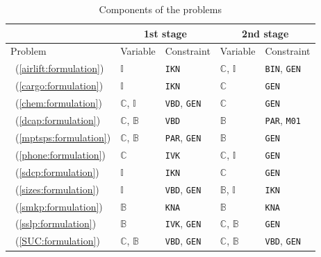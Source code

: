 \begin{table}[H]
	\centering
	\caption{Components of the problems}
	\label{table:prob_class}
	\begin{threeparttable}
		\begin{tabular}{@{}lllll@{}}
			\toprule
			& \multicolumn{2}{c}{1st stage}                              				  	& \multicolumn{2}{c}{2nd stage}                             			        \\ \midrule
			Problem 	     & Variable                    & Constraint                   	& Variable                    & Constraint                  				    \\ \midrule
			\airlift\ (\ref{airlift:formulation}) & $\mathbb{I}$ & \texttt{IKN}& $\mathbb{C}$, $\mathbb{I}$ & \texttt{BIN}, \texttt{GEN}\\
			\cargo\ (\ref{cargo:formulation}) & $\mathbb{I}$ & \texttt{IKN} & $\mathbb{C}$ & \texttt{GEN}\\		
			\chem\ (\ref{chem:formulation}) & $\mathbb{C}$, $\mathbb{I}$ & \texttt{VBD}, \texttt{GEN} & $\mathbb{C}$ & \texttt{GEN}\\				
			\dcap\ (\ref{dcap:formulation})    & $\mathbb{C}$, $\mathbb{B}$  & \texttt{VBD}                	& $\mathbb{B}$                & \texttt{PAR}, \texttt{M01} 			    		\\
			\mptsps\ (\ref{mptsps:formulation})  & $\mathbb{C}$, $\mathbb{B}$  & \texttt{PAR}, \texttt{GEN}		& $\mathbb{B}$                & \texttt{GEN}               						\\
			\phone\ (\ref{phone:formulation}) & $\mathbb{C}$ & \texttt{IVK} & $\mathbb{C}$, $\mathbb{I}$ & \texttt{GEN} \\			
			\sdcp\ (\ref{sdcp:formulation}) & $\mathbb{I}$ & \texttt{IKN}& $\mathbb{C}$ & \texttt{GEN}\\
			\sizes\ (\ref{sizes:formulation})   & $\mathbb{I}$ 			   & \texttt{VBD}, \texttt{GEN} 	& $\mathbb{B}$, $\mathbb{I}$  & \texttt{IKN}             						\\
			\smkp\ (\ref{smkp:formulation})   & $\mathbb{B}$                & \texttt{KNA}                	& $\mathbb{B}$                & \texttt{KNA}              						\\
			\sslp\ (\ref{sslp:formulation})   & $\mathbb{B}$                & \texttt{IVK}, \texttt{GEN} 	& $\mathbb{C}$, $\mathbb{B}$  & \texttt{GEN}             						\\
			\suc\ (\ref{SUC:formulation})   & $\mathbb{C}$, $\mathbb{B}$                 & \texttt{VBD}, \texttt{GEN}       	& $\mathbb{C}$, $\mathbb{B}$  &  \texttt{VBD}, \texttt{GEN}                                  					\\ \bottomrule
		\end{tabular}
		

\end{threeparttable}
\end{table}
